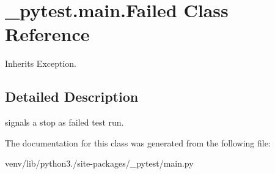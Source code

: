 \hypertarget{class__pytest_1_1main_1_1_failed}{}\section{\+\_\+pytest.\+main.\+Failed Class Reference}
\label{class__pytest_1_1main_1_1_failed}


Inherits Exception.



\subsection{Detailed Description}
\begin{DoxyVerb}signals a stop as failed test run. \end{DoxyVerb}
 

The documentation for this class was generated from the following file\+:\begin{DoxyCompactItemize}
\item 
venv/lib/python3./site-\/packages/\+\_\+pytest/main.\+py\end{DoxyCompactItemize}
